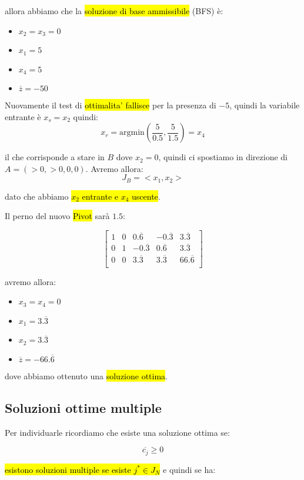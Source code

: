allora abbiamo che la \hl{soluzione di base ammissibile} (BFS) è:

\begin{itemize}
	\item $x_2 = x_3 = 0$
	\item $x_1 = 5$
	\item $x_4 = 5$
	\item $\overline{z} = -50$
\end{itemize}

Nuovamente il test di \hl{ottimalita' fallisce} per la presenza di $-5$, quindi la variabile entrante è $x_s = x_2$ quindi:
$$x_r = \text{argmin} (\frac{5}{0.5}, \frac{5}{1.5}) = x_4$$

il che corrisponde a stare in $B$ dove $x_2 = 0$, quindi ci spostiamo in direzione di $A = (> 0, > 0, 0, 0)$. Avremo allora:
$$J_B = <x_1, x_2>$$

dato che abbiamo \hl{$x_2$ entrante e $x_4$ uscente}.

Il perno del nuovo \hl{Pivot} sarà $1.5$:

$$
\left[ {\begin{array}{ccccc}
	1 & 0 & 0.\overline{6} & -0.\overline{3} & 3.\overline{3}\\
	0 & 1 & -0.\overline{3} & 0.\overline{6} & 3.\overline{3}\\
	0 & 0 & 3.\overline{3} & 3.\overline{3} & 66.\overline{6}\\
\end{array} } \right]
$$

avremo allora: 
\begin{itemize}
	\item $x_3 = x_4 = 0$
	\item $x_1 = 3.\overline{3}$
	\item $x_2 = 3.\overline{3}$
	\item $\overline{z} = -66.\overline{6}$
\end{itemize}

dove abbiamo ottenuto una \hl{soluzione ottima}.


\subsection{Soluzioni ottime multiple}

Per individuarle ricordiamo che esiste una soluzione ottima se: 

$$\overline{c_j} \geq 0$$

\hl{esistono soluzioni multiple se esiste $j^{*} \in J_N$} e quindi se ha:

